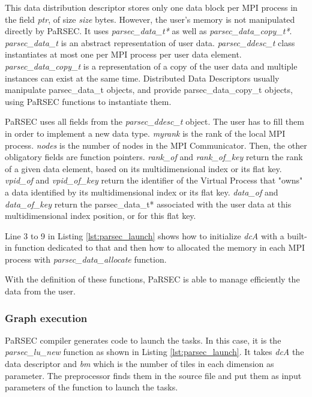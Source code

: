 This data distribution descriptor stores only one data block per MPI \cite{MPIForum} process in the field \textit{ptr}, of size \textit{size} bytes.
However, the user's memory is not manipulated directly by PaRSEC.
It uses \textit{parsec\_data\_t*} as well as \textit{parsec\_data\_copy\_t*}.
\textit{parsec\_data\_t} is an abstract representation of user data.
\textit{parsec\_ddesc\_t} class instantiates at most one per MPI process per user data element.
\textit{parsec\_data\_copy\_t} is a representation of a copy of the user data and multiple instances can exist at the same time.
Distributed Data Descriptors usually manipulate parsec\_data\_t objects, and provide parsec\_data\_copy\_t objects, using PaRSEC functions to instantiate them.


\begin{figure}[h]

\end{figure}

PaRSEC uses all fields from the \textit{parsec\_ddesc\_t} object.
The user has to fill them in order to implement a new data type.
\textit{myrank} is the rank of the local MPI process.
\textit{nodes} is the number of nodes in the MPI Communicator.
Then, the other obligatory fields are function pointers.
\textit{rank\_of} and \textit{rank\_of\_key} return the rank of a given data element, based on its multidimensional index or its flat key.
\textit{vpid\_of} and \textit{vpid\_of\_key} return the identifier of the Virtual Process that "owns" a data identified by its multidimensional index or its flat key.
\textit{data\_of} and \textit{data\_of\_key} return the parsec\_data\_t* associated with the user data at this multidimensional index position, or for this flat key.

Line 3 to 9 in Listing \ref{lst:parsec_launch} shows how to initialize \textit{dcA} with a built-in function dedicated to that and then how to allocated the memory in each MPI process with \textit{parsec\_data\_allocate} function.

With the definition of these functions, PaRSEC is able to manage efficiently the data from the user.


\subsubsection{Graph execution}
PaRSEC compiler generates code to launch the tasks.
In this case, it is the \textit{parsec\_lu\_new} function as shown in Listing \ref{lst:parsec_launch}.
It takes \textit{dcA} the data descriptor and \textit{bm} which is the number of tiles in each dimension as parameter.
The preprocessor finds them in the source file and put them as input parameters of the function to launch the tasks.

